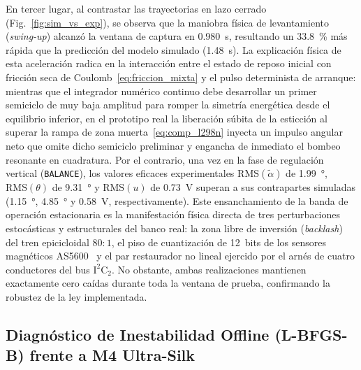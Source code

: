 En tercer lugar, al contrastar las trayectorias en lazo cerrado (Fig.~\ref{fig:sim_vs_exp}), se observa que la maniobra física de levantamiento (\textit{swing-up}) alcanzó la ventana de captura en \qty{0.980}{\second}, resultando un \qty{33.8}{\percent} más rápida que la predicción del modelo simulado (\qty{1.48}{\second}). La explicación física de esta aceleración radica en la interacción entre el estado de reposo inicial con fricción seca de Coulomb~\eqref{eq:friccion_mixta} y el pulso determinista de arranque: mientras que el integrador numérico continuo debe desarrollar un primer semiciclo de muy baja amplitud para romper la simetría energética desde el equilibrio inferior, en el prototipo real la liberación súbita de la esticción al superar la rampa de zona muerta~\eqref{eq:comp_l298n} inyecta un impulso angular neto que omite dicho semiciclo preliminar y engancha de inmediato el bombeo resonante en cuadratura. Por el contrario, una vez en la fase de regulación vertical (\texttt{BALANCE}), los valores eficaces experimentales $\mathrm{RMS}(\tilde{\alpha})$ de \qty{1.99}{\degree}, $\mathrm{RMS}(\theta)$ de \qty{9.31}{\degree} y $\mathrm{RMS}(u)$ de \qty{0.73}{\volt} superan a sus contrapartes simuladas (\qty{1.15}{\degree}, \qty{4.85}{\degree} y \qty{0.58}{\volt}, respectivamente). Este ensanchamiento de la banda de operación estacionaria es la manifestación física directa de tres perturbaciones estocásticas y estructurales del banco real: la zona libre de inversión (\textit{backlash}) del tren epicicloidal $80:1$, el piso de cuantización de 12~bits de los sensores magnéticos AS5600~\cite{ams2018} y el par restaurador no lineal ejercido por el arnés de cuatro conductores del bus $\text{I}^2\text{C}_2$. No obstante, ambas realizaciones mantienen exactamente cero caídas durante toda la ventana de prueba, confirmando la robustez de la ley implementada.

\subsection{Diagnóstico de Inestabilidad Offline (L-BFGS-B) frente a M4 Ultra-Silk}\label{subsec:diagnostico_lbfgsb}

